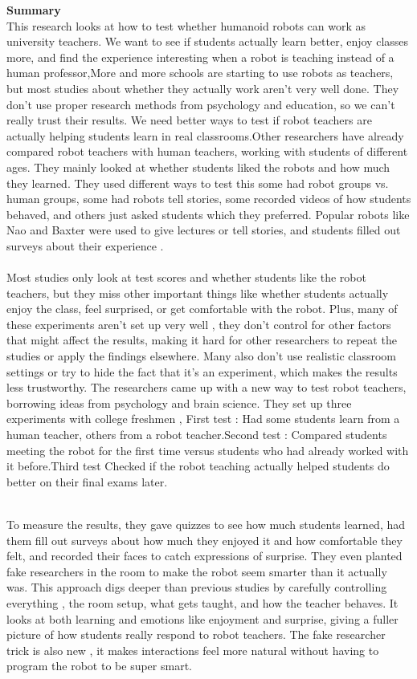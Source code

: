 \documentclass[report.tex]{subfiles}
\begin{document}
\noindent\textbf{Summary} \\
This research looks at how to test whether humanoid robots can work as university teachers. We want to see if students actually learn better, enjoy classes more, and find the experience interesting when a robot is teaching instead of a human professor,More and more schools are starting to use robots as teachers, but most studies about whether they actually work aren't very well done. They don't use proper research methods from psychology and education, so we can't really trust their results. We need better ways to test if robot teachers are actually helping students learn in real classrooms.Other researchers have already compared robot teachers with human teachers, working with students of different ages. They mainly looked at whether students liked the robots and how much they learned. They used different ways to test this some had robot groups vs. human groups, some had robots tell stories, some recorded videos of how students behaved, and others just asked students which they preferred. Popular robots like Nao and Baxter were used to give lectures or tell stories, and students filled out surveys about their experience .\\\\ Most studies only look at test scores and whether students like the robot teachers, but they miss other important things like whether students actually enjoy the class, feel surprised, or get comfortable with the robot. Plus, many of these experiments aren't set up very well  , they don't control for other factors that might affect the results, making it hard for other researchers to repeat the studies or apply the findings elsewhere. Many also don't use realistic classroom settings or try to hide the fact that it's an experiment, which makes the results less trustworthy.
The researchers came up with a new way to test robot teachers, borrowing ideas from psychology and brain science. They set up three experiments with college freshmen , First test :  Had some students learn from a human teacher, others from a robot teacher.Second test :  Compared students meeting the robot for the first time versus students who had already worked with it before.Third test  Checked if the robot teaching actually helped students do better on their final exams later.

\noindent\textbf{}\\To measure the results, they gave quizzes to see how much students learned, had them fill out surveys about how much they enjoyed it and how comfortable they felt, and recorded their faces to catch expressions of surprise. They even planted fake researchers in the room to make the robot seem smarter than it actually was.
This approach digs deeper than previous studies by carefully controlling everything  , the room setup, what gets taught, and how the teacher behaves. It looks at both learning and emotions like enjoyment and surprise, giving a fuller picture of how students really respond to robot teachers. The fake researcher trick is also new  , it makes interactions feel more natural without having to program the robot to be super smart.
\end{document}
